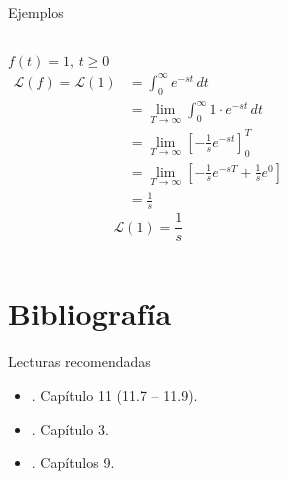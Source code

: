 \documentclass[9pt, aspectratio=169]{beamer}
\begin{document}
\begin{frame}{Ejemplos}
\begin{columns}[t]
\cx
$f(t) = 1, \, t \geq 0$
\begin{align*}
    \mathscr{L}(f) = \mathscr{L}(1) &= \int_0^{\infty} e^{-st} \, dt \\
&= \lim_{T \rightarrow \infty} \int_0^{\infty} 1 \cdot e^{-s t} \, dt \\
&= \lim_{T \rightarrow \infty} \left[ -\frac{1}{s} e^{-s t} \right]_0^T \\
&= \lim_{T \rightarrow \infty} \left[ -\frac{1}{s} e^{-s T} + \frac{1}{s} e^0 \right] \\
&= \frac{1}{s}
\end{align*}
\[ \boxed{ \mathscr{L}(1) = \frac{1}{s} } \]
\pause

 
 
\cx
\end{columns}

\end{frame}


\section*{Bibliografía}
\begin{frame}[allowframebreaks]{Lecturas recomendadas}
\begin{itemize}
 \item {}. Capítulo 11 (11.7 -- 11.9).
 \item {}. Capítulo 3.
 \item {}. Capítulos 9.
\end{itemize}
\end{frame}
\end{document}
